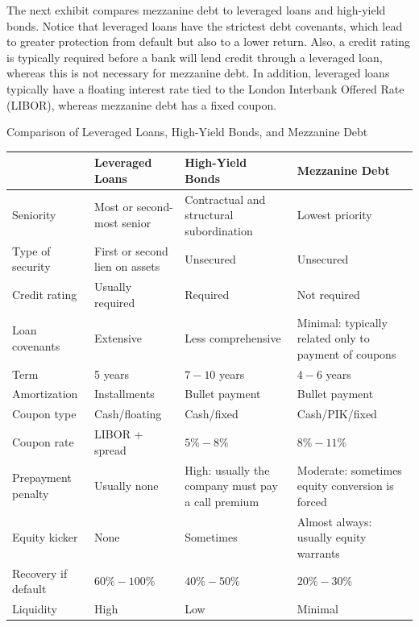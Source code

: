 \documentclass[11pt]{article}
\begin{document}
The next exhibit compares mezzanine debt to leveraged loans and high-yield bonds. Notice that leveraged loans have the strictest debt covenants, which lead to greater protection from default but also to a lower return. Also, a credit rating is typically required before a bank will lend credit through a leveraged loan, whereas this is not necessary for mezzanine debt. In addition, leveraged loans typically have a floating interest rate tied to the London Interbank Offered Rate (LIBOR), whereas mezzanine debt has a fixed coupon.

Comparison of Leveraged Loans, High-Yield Bonds, and Mezzanine Debt

\begin{center}
\begin{tabular}{|l|l|l|l|}
\hline
 & Leveraged Loans & High-Yield Bonds & Mezzanine Debt \\
\hline
Seniority & Most or second-most senior & Contractual and structural subordination & Lowest priority \\
\hline
Type of security & First or second lien on assets & Unsecured & Unsecured \\
\hline
Credit rating & Usually required & Required & Not required \\
\hline
Loan covenants & Extensive & Less comprehensive & Minimal: typically related only to payment of coupons \\
\hline
Term & 5 years & $7-10$ years & $4-6$ years \\
\hline
Amortization & Installments & Bullet payment & Bullet payment \\
\hline
Coupon type & Cash/floating & Cash/fixed & Cash/PIK/fixed \\
\hline
Coupon rate & LIBOR + spread & $5 \%-8 \%$ & $8 \%-11 \%$ \\
\hline
Prepayment penalty & Usually none & High: usually the company must pay a call premium & Moderate: sometimes equity conversion is forced \\
\hline
Equity kicker & None & Sometimes & Almost always: usually equity warrants \\
\hline
Recovery if default & $60 \%-100 \%$ & $40 \%-50 \%$ & $20 \%-30 \%$ \\
\hline
Liquidity & High & Low & Minimal \\
\hline
\end{tabular}
\end{center}
\end{document}
